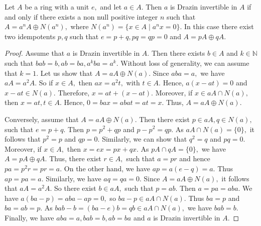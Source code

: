 \documentclass{article}
\begin{document}
\begin{theorem}
Let $A$ be a ring with a unit $e,$ and let $a \in A.$ Then $a$ is
Drazin invertible in $A$ if and only if there exists a non null
positive integer $n$ such that $ A = a^nA \oplus N(a^n), $ where
$ N(a^n)= \{ x \in A \mid a^nx=0 \}.$ In this case there exist
two idempotents $ p, q$ such that $ e= p+q , pq=qp=0$ and $A= pA
\oplus qA.$
\end{theorem}

\begin{proof}
Assume that $a$ is Drazin invertible in $A.$ Then there exists
$b \in A $ and $ k \in \mathbb{N}$ such that $ bab=b, ab=ba,
a^kba=a^k.$ Without loss of generality, we can assume that $k=1.$
Let us show that $ A= aA \oplus N(a).$ Since $ aba=a,$ we have $
aA= a^2 A.$ So if $x \in A,$ then $ ax= a^2t, $ with $ t\in A.$
Hence, $ a(x- at)=0$ and $ x - at \in N(a).$ Therefore, $ x= at +
(x-at).$ Moreover, if $ x \in aA \cap N(a),$  then $ x=at,t \in
A.$ Hence, $ 0= bax= abat= at=x.$   Thus, $ A = aA \oplus N(a).$

Conversely, assume that $ A= aA \oplus N(a).$ Then there
exist $ p \in aA,  q \in N(a),$ such that $ e=p+q.$ Then $p= p^2 +
qp$ and $p-p^2= qp.$ As $ aA \cap N(a) = \{0\},$ it follows that
$p^2= p$ and $qp=0.$ Similarly, we can show that $q^2=q$ and
$ pq=0.$ Moreover, if $ x\in A,$ then $x= ex= px+ qx.$ As $pA \cap
qA= \{ 0\},$ we have $ A= pA \oplus qA.$ Thus, there exist $ r \in
A,$ such that  $a=pr$ and hence $pa= p^2r= pr=a.$ On the other
hand, we have $ ap= a(e-q)= a.$ Thus $ap=pa=a.$ Similarly, we have
$ aq=qa=0.$
Since $ A= aA \oplus N(a),$ it follows that $aA= a^2A.$ So there
exist $ b \in aA,$ such that $ p= ab.$ Then $ a= pa= aba.$ We have
$ a(ba-p)= aba-ap=  0,$ so $ ba-p \in aA \cap N(a).$ Thus $ba=p$
and $ ba=ab=p.$ As $ bab- b= (ba-e)b= qb \in aA \cap N(a),$ we
have  $bab=b.$ Finally, we have $aba=a, bab=b, ab=ba$ and $a$ is
Drazin invertible in $A.$
\end{proof}
\end{document}
